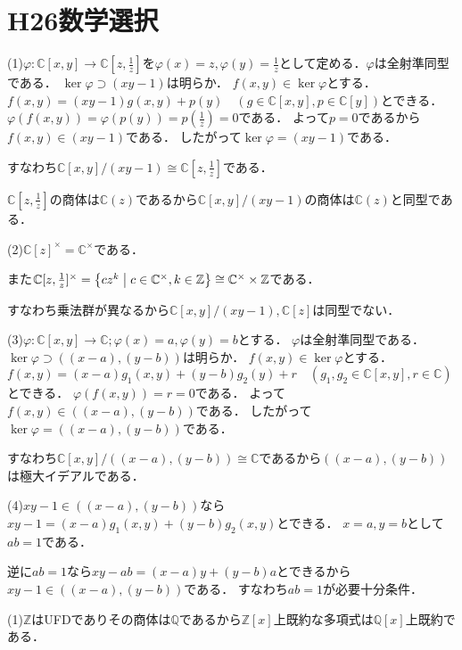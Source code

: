 \documentclass[
		book,
		head_space=20mm,
		foot_space=20mm,
		gutter=10mm,
		line_length=190mm
]{jlreq}
\begin{document}
\section{H26数学選択}
(1)$\varphi\colon \mathbb{C}[x,y]\rightarrow \mathbb{C}[z,\frac{1}{z}]$を$\varphi(x)=z,\varphi(y)=\frac{1}{z}$として定める．$\varphi$は全射準同型である．
$\ker \varphi\supset (xy-1)$は明らか．
$f(x,y)\in \ker \varphi$とする．$f(x,y)=(xy-1)g(x,y)+p(y)\quad(g\in \mathbb{C}[x,y],p\in \mathbb{C}[y])$とできる．
$\varphi(f(x,y))=\varphi(p(y))=p(\frac{1}{z})=0$である．
よって$p=0$であるから$f(x,y)\in (xy-1)$である．
したがって$\ker \varphi=(xy-1)$である．

すなわち$\mathbb{C}[x,y]/(xy-1)\cong \mathbb{C}[z,\frac{1}{z}]$である．

$\mathbb{C}[z,\frac{1}{z}]$の商体は$\mathbb{C}(z)$であるから$\mathbb{C}[x,y]/(xy-1)$の商体は$\mathbb{C}(z)$と同型である．

(2)$\mathbb{C}[z]^\times=\mathbb{C}^\times$である．

また$\mathbb{C}[z,\frac{1}{z}]^\times=\left\{ cz^k \mathrel{}\middle|\mathrel{} c\in \mathbb{C}^\times,k\in \mathbb{Z} \right\}\cong \mathbb{C}^\times \times \mathbb{Z}$である．

すなわち乗法群が異なるから$\mathbb{C}[x,y]/(xy-1),\mathbb{C}[z]$は同型でない．

(3)$\varphi\colon \mathbb{C}[x,y]\rightarrow \mathbb{C};\varphi(x)=a,\varphi(y)=b$とする．
$\varphi$は全射準同型である．
$\ker \varphi\supset ((x-a),(y-b))$は明らか．
$f (x,y)\in \ker \varphi$とする．$f(x,y)=(x-a)g_1(x,y)+(y-b)g_2(y)+r \quad (g_1,g_2\in \mathbb{C}[x,y],r\in \mathbb{C})$とできる．
$\varphi(f(x,y))=r=0$である．
よって$f(x,y)\in ((x-a),(y-b))$である．
したがって$\ker \varphi=((x-a),(y-b))$である．

すなわち$\mathbb{C}[x,y]/((x-a),(y-b))\cong \mathbb{C}$であるから$((x-a),(y-b))$は極大イデアルである．

(4)$xy-1\in ((x-a),(y-b))$なら$xy-1=(x-a)g_1(x,y)+(y-b)g_2(x,y)$とできる．
$x=a,y=b$として$ab=1$である．

逆に$ab=1$なら$xy-ab=(x-a)y+(y-b)a$とできるから$xy-1\in ((x-a),(y-b))$である．
すなわち$ab=1$が必要十分条件．

(1)$\mathbb{Z}$はUFDでありその商体は$\mathbb{Q}$であるから$\mathbb{Z}[x]$上既約な多項式は$\mathbb{Q}[x]$上既約である．
\end{document}
